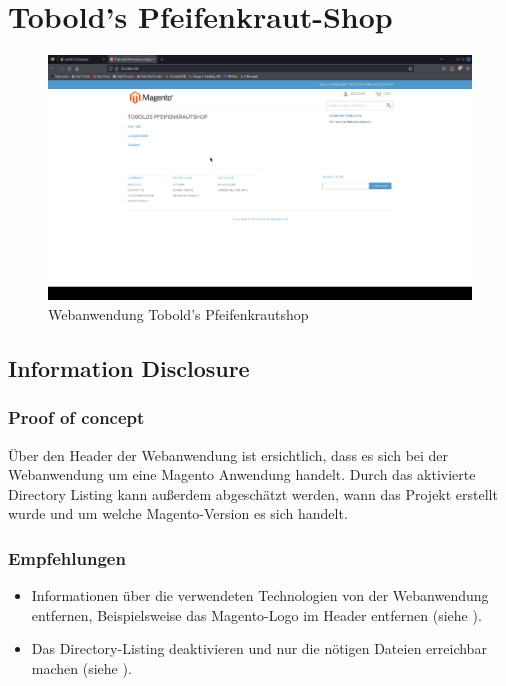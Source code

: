 \chapter{Tobold's Pfeifenkraut-Shop}

\vfill
\begin{figure}[!ht]
    \centering
    \includegraphics[width=\linewidth]{images/screenshots/09_pfeifenkraut_shop.png}
    \caption{Webanwendung Tobold's Pfeifenkrautshop}
    \label{fig:07_pfeifenkraut_shop}
\end{figure}
\vfill
\newpage



\section{\makecvssbadge Information Disclosure}

\subsection*{Proof of concept}
Über den Header der Webanwendung ist ersichtlich, dass es sich bei der Webanwendung um eine Magento Anwendung handelt. Durch das aktivierte Directory Listing kann außerdem abgeschätzt werden, wann das Projekt erstellt wurde und um welche Magento-Version es sich handelt.

\subsection*{Empfehlungen}
\begin{itemize}
    \item Informationen über die verwendeten Technologien von der Webanwendung entfernen, Beispielsweise das Magento-Logo im Header entfernen (siehe \cite{owaspSecurityMisconfiguration}).
    \item Das Directory-Listing deaktivieren und nur die nötigen Dateien erreichbar machen (siehe \cite{owaspSecurityMisconfiguration}).
\end{itemize}

